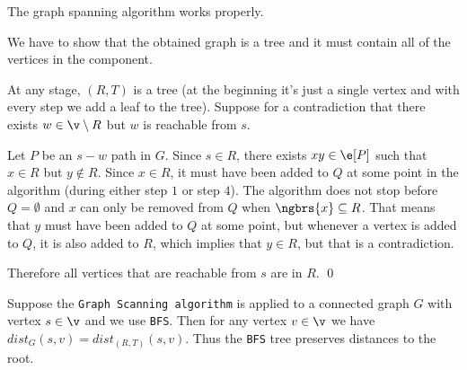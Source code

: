 \begin{customlemma}{1.18}
    \label{lemma:1.18}
    The graph spanning algorithm works properly.
\end{customlemma}
\begin{prf}
    We have to show that the obtained graph is a tree and it must contain all of the vertices in the component.

    At any stage, $(R, T)$ is a tree (at the beginning it's just a single vertex and with every step we add a leaf to the tree). Suppose for a contradiction that there exists $w \in \v \setminus R$ but $w$ is reachable from $s$.

    Let $P$ be an $s - w$ path in $G$. Since $s \in R$, there exists $xy \in \e[P]$ such that $x \in R$ but $y \notin R$. Since $x \in R$, it must have been added to $Q$ at some point in the algorithm (during either step $1$ or step $4$). The algorithm does not stop before $Q = \emptyset$ and $x$ can only be removed from $Q$ when $\ngbrs{x} \subseteq R$. That means that $y$ must have been added to $Q$ at some point, but whenever a vertex is added to $Q$, it is also added to $R$, which implies that $y \in R$, but that is a contradiction.

    Therefore all vertices that are reachable from $s$ are in $R$. \qed
\end{prf}
\begin{customlemma}{1.19}
    \label{lemma:1.19}
    Suppose the \texttt{Graph Scanning algorithm} is applied to a connected graph $G$ with vertex $s \in \v$ and we use \texttt{BFS}. Then for any vertex $v \in \v$ we have $dist_G(s, v) = dist_{(R, T)}(s, v)$. Thus the \texttt{BFS} tree preserves distances to the root.
\end{customlemma}

